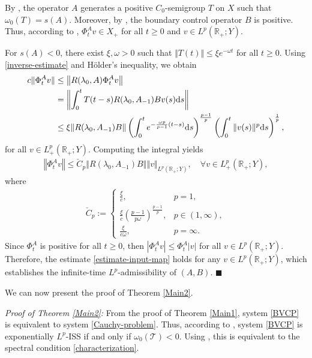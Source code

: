\documentclass[onecolumn]{autart}
\def\R{{\mathbb{R}}}
\def\calT{{\mathcal{T}}}
\def\calB{{\mathcal{B}}}
\def\calA{{\mathcal{A}}}
\def\R{\mathbb R}
\numberwithin{equation}{section}
\newenvironment{proof}{{\it Proof: \enspace}}{\hfill $\blacksquare$\par}
\begin{document}
	\begin{proof}
		By \cite[Thm. 2.5]{Arendt}, the operator $A$ generates a positive $C_0$-semigroup $T$ on $X$ such that $\omega_0(T) = s(A)$. Moreover, by \cite[Prop. 4.3]{SGPS}, the boundary control operator $B$ is positive. Thus, according to \cite[Thm. 2.7]{ELLC}, $\Phi_t^A v \in X_+$ for all $t \ge 0$ and $v \in L^p(\R_+;Y)$.
		
		For $s(A)<0$, there exist ${\xi},\omega>0$ such that $\Vert T(t)\Vert \leq {\xi}e^{-\omega t}$ for all $t\ge 0$. Using  {\eqref{inverse-estimate}} and H\"{o}lder's inequality, we obtain
		\begin{align*}
			c\Vert \Phi_{t}^A v\Vert & \le \left\Vert R(\lambda_0,A) \Phi_{t}^A v\right\Vert \\
			&= \left\Vert \int_{0}^{t}T(t-s)R(\lambda_0,A_{-1})B v(s){\rm{d}}s\right\Vert \\
			&\leq {\xi}\Vert R(\lambda_0,A_{-1})B\Vert\left(\int_{0}^{t}e^{-\frac{\omega p}{p-1} (t-s)}{\rm{d}}s\right)^{\frac{p-1}{p}} \left( \int_{0}^{t} \Vert v(s) \Vert^p {\rm{d}}s\right)^{\frac{1}{p}},
		\end{align*}
		for all $v\in {L^p_+}(\R_+;Y)$. Computing the integral yields
		\begin{align}\label{estimate-input-map}
			\left\Vert \Phi_t^A v \right\Vert \le \check{C}_p \left\Vert R(\lambda_0, A_{-1}) B \right\Vert \Vert v \Vert_{L^p(\R_+;Y)}, \quad \forall v \in L^p_+ (\R_+; Y),
		\end{align}
		where
		\begin{align*}%
			\check{C}_p := \begin{cases}
				\frac{{\xi}}{c}, & p = 1,\\
				\frac{{\xi}}{c} \left( \frac{p-1}{p \omega} \right)^{\frac{p-1}{p}}, & p \in(1,\infty), \\
				\frac{{\xi}}{c\omega}, & p =\infty.
			\end{cases}
		\end{align*}
		Since $\Phi_t^A$ is positive for all $t \ge 0$, then $\left\vert \Phi_t^A v \right\vert \le \Phi_t^A \vert v \vert$ for all $v \in L^p(\R_+; Y)$. Therefore, the estimate \eqref{estimate-input-map} holds for any $v \in L^p(\R_+; Y)$, which establishes the infinite-time $L^p$-admissibility of $(A,B)$.
	\end{proof}

    We can now present the proof of Theorem \ref{Main2}.

 	 \emph{Proof of Theorem \ref{Main2}: \enspace} 		%
		From the proof of Theorem \ref{Main1}, system \eqref{BVCP} is equivalent to system \eqref{Cauchy-problem}. Thus, according to \cite[Prop. 2.10]{JaNPS},   system \eqref{BVCP} is exponentially $L^p$-ISS if and only if $\omega_0(\calT)<0$. Using \cite[Thm. 2]{El1}, this is equivalent to the spectral condition \eqref{characterization}.
		
\end{document}

